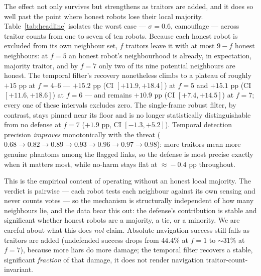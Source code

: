 The effect not only survives but strengthens as traitors are added, and it
does so well past the point where honest robots lose their local majority.
Table~\ref{tab:headline} isolates the worst case --- $\sigma=0.6$,
camouflage --- across traitor counts from one to seven of ten robots.
Because each honest robot is excluded from its own neighbour set, $f$
traitors leave it with at most $9-f$ honest neighbours: at $f=5$ an honest
robot's neighbourhood is already, in expectation, majority traitor, and by
$f=7$ only two of its nine potential neighbours are honest. The temporal
filter's recovery nonetheless climbs to a plateau of roughly $+15$ pp at
$f=4$--$6$ --- $+15.2$ pp (CI $[+11.9,+18.4]$) at $f=5$ and $+15.1$ pp
(CI $[+11.6,+18.6]$) at $f=6$ --- and remains $+10.9$ pp
(CI $[+7.4,+14.5]$) at $f=7$; every one of these intervals excludes zero.
The single-frame robust filter, by contrast, stays pinned near its floor and
is no longer statistically distinguishable from no defense at $f=7$
($+1.9$ pp, CI $[-1.3,+5.2]$). Temporal detection precision \emph{improves}
monotonically with the threat ($0.68\to0.82\to0.89\to0.93\to0.96\to0.97
\to0.98$): more traitors mean more genuine phantoms among the flagged links,
so the defense is most precise exactly when it matters most, while no-harm
stays flat at $\approx\!-0.4$ pp throughout.

This is the empirical content of operating without an honest local majority.
The verdict is pairwise --- each robot tests each neighbour against its own
sensing and never counts votes --- so the mechanism is structurally
independent of how many neighbours lie, and the data bear this out: the
defense's contribution is stable and significant whether honest robots are a
majority, a tie, or a minority. We are careful about what this does
\emph{not} claim. Absolute navigation success still falls as traitors are
added (undefended success drops from $44.4\%$ at $f=1$ to $\sim\!31\%$ at
$f=7$), because more liars do more damage; the temporal filter recovers a
stable, significant \emph{fraction} of that damage, it does not render
navigation traitor-count-invariant.


